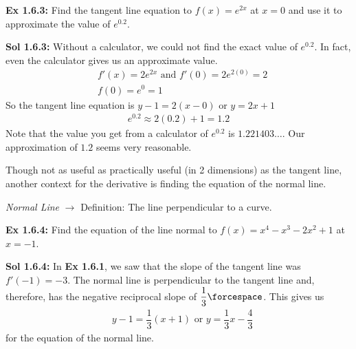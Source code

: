 \begin{tcolorbox}[example] 
    \textbf{Ex 1.6.3: } Find the tangent line equation to $f(x) = e^{2x}$ at $x = 0$ and use it to approximate the value of $e^{0.2}$.
\end{tcolorbox}
\begin{tcolorbox}[solution]
    \textbf{Sol 1.6.3: } Without a calculator, we could not find the exact value of $e^{0.2}$. In fact, even the calculator gives us an approximate value. \begin{align*}
        & f'(x) = 2e^{2x} \text{ and } f'(0) = 2e^{2(0)} = 2 \\[11pt]
        & f(0) = e^0 = 1 
    \end{align*} 
    So the tangent line equation is $\boxed{y - 1 = 2(x - 0)}$ or $y = \boxed{2x + 1}$ \begin{align*}
        e^{0.2} \approx 2(0.2)+ 1 = \boxed{1.2}
    \end{align*}
    Note that the value you get from a calculator of $e^{0.2}$ is $1.221403 \dots$. Our approximation of $1.2$ seems very reasonable.
\end{tcolorbox}

Though not as useful as practically useful (in 2 dimensions) as the tangent line, another context for the derivative is finding the equation of the normal line. \par

\begin{tcolorbox}[definition]
    \textit{Normal Line} $\rightarrow$ Definition: The line perpendicular to a curve.
\end{tcolorbox} \vspace{11pt}

\begin{tcolorbox}[example]
    \textbf{Ex 1.6.4: } Find the equation of the line normal to $f(x) = x^4 - x^3 - 2x^2 + 1$ at $x = -1$.
\end{tcolorbox}
\begin{tcolorbox}[solution]
    \textbf{Sol 1.6.4: } In \textbf{Ex 1.6.1}, we saw that the slope of the tangent line was $f'(-1) = -3$. The normal line is perpendicular to the tangent line and, therefore, has the negative reciprocal slope of $\dfrac{1}{3} \forcespace$. This gives us \begin{align*}
        & \boxed{y - 1 = \dfrac{1}{3}(x + 1)} \text{ or } \boxed{y = \dfrac{1}{3}x - \dfrac{4}{3}}
    \end{align*} for the equation of the normal line.
\end{tcolorbox}

